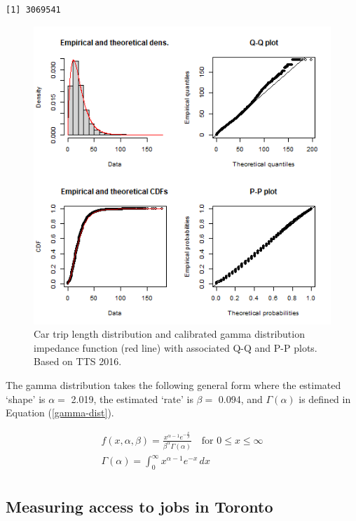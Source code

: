 \documentclass[]{elsarticle} %
\begin{document}
\begin{verbatim}
[1] 3069541
\end{verbatim}

\begin{figure}

{\centering \includegraphics[width=0.8\linewidth]{images/impedance_function} 

}

\caption{\label{fig:TLD-Gamma-plot}Car trip length distribution and calibrated gamma distribution impedance function (red line) with associated Q-Q and P-P plots. Based on TTS 2016.}\label{fig:TLD-Gamma-plot}
\end{figure}

The gamma distribution takes the following general form where the
estimated `shape' is \(\alpha=\) 2.019, the estimated `rate' is
\(\beta =\) 0.094, and \(\Gamma(\alpha)\) is defined in Equation
(\ref{gamma-dist}).

\begin{equation}
\label{gamma-dist}
\begin{array}{l} 
f(x, \alpha, \beta) = \frac {x^{\alpha-1}e^{-\frac{x}{\beta}}}{ \beta^{\alpha}\Gamma(\alpha)} \quad \text{for } 0 \leq x \leq \infty\\

\Gamma(\alpha) =  \int_{0}^{\infty} x^{\alpha-1}e^{-x} \,dx\\
\end{array}
\end{equation}

\hypertarget{measuring-access-to-jobs-in-toronto}{%
\subsection{Measuring access to jobs in
Toronto}\label{measuring-access-to-jobs-in-toronto}}
\end{document}
